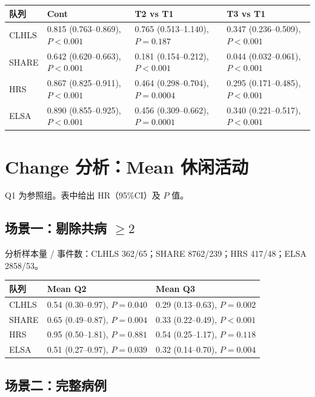 \documentclass[11pt,a4paper]{article}
\begin{document}
\begin{center}\footnotesize
\begin{tabular}{lp{4.6cm}p{4.6cm}p{4.6cm}}
\toprule
队列 & Cont & T2 vs T1 & T3 vs T1 \\
\midrule
CLHLS & 0.815 (0.763--0.869), $P{<}0.001$ & 0.765 (0.513--1.140), $P{=}0.187$ & 0.347 (0.236--0.509), $P{<}0.001$ \\
SHARE & 0.642 (0.620--0.663), $P{<}0.001$ & 0.181 (0.154--0.212), $P{<}0.001$ & 0.044 (0.032--0.061), $P{<}0.001$ \\
HRS & 0.867 (0.825--0.911), $P{<}0.001$ & 0.464 (0.298--0.704), $P{=}0.0004$ & 0.295 (0.171--0.485), $P{<}0.001$ \\
ELSA & 0.890 (0.855--0.925), $P{<}0.001$ & 0.456 (0.309--0.662), $P{=}0.0001$ & 0.340 (0.221--0.517), $P{<}0.001$ \\
\bottomrule
\end{tabular}
\end{center}

\section{Change 分析：Mean 休闲活动}

Q1 为参照组。表中给出 HR（95\%CI）及 $P$ 值。

\subsection{场景一：剔除共病 $\ge 2$}

{\footnotesize 分析样本量 / 事件数：CLHLS 362/65；SHARE 8762/239；HRS 417/48；ELSA 2858/53。}

\begin{center}\footnotesize
\begin{tabular}{lp{6.8cm}p{6.8cm}}
\toprule
队列 & Mean Q2 & Mean Q3 \\
\midrule
CLHLS & 0.54 (0.30--0.97), $P{=}0.040$ & 0.29 (0.13--0.63), $P{=}0.002$ \\
SHARE & 0.65 (0.49--0.87), $P{=}0.004$ & 0.33 (0.22--0.49), $P{<}0.001$ \\
HRS & 0.95 (0.50--1.81), $P{=}0.881$ & 0.54 (0.25--1.17), $P{=}0.118$ \\
ELSA & 0.51 (0.27--0.97), $P{=}0.039$ & 0.32 (0.14--0.70), $P{=}0.004$ \\
\bottomrule
\end{tabular}
\end{center}

\subsection{场景二：完整病例}
\end{document}
